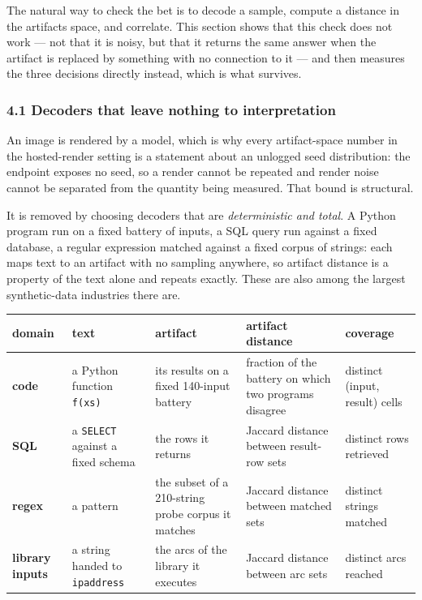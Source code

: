 \documentclass[
  10pt,
]{article}
\theoremstyle{plain}
\theoremstyle{definition}
\begin{document}
The natural way to check the bet is to decode a sample, compute a
distance in the artifact\textquotesingle s space, and correlate. This
section shows that this check does not work --- not that it is noisy,
but that it returns the same answer when the artifact is replaced by
something with no connection to it --- and then measures the three
decisions directly instead, which is what survives.

\subsubsection{4.1 Decoders that leave nothing to
interpretation}\label{41-decoders-that-leave-nothing-to-interpretation}

An image is rendered by a model, which is why every artifact-space
number in the hosted-render setting is a statement about an unlogged
seed distribution: the endpoint exposes no seed, so a render cannot be
repeated and render noise cannot be separated from the quantity being
measured. That bound is structural.

It is removed by choosing decoders that are \emph{deterministic and
total}. A Python program run on a fixed battery of inputs, a SQL query
run against a fixed database, a regular expression matched against a
fixed corpus of strings: each maps text to an artifact with no sampling
anywhere, so artifact distance is a property of the text alone and
repeats exactly. These are also among the largest synthetic-data
industries there are.

{\footnotesize
\begin{longtable}[]{@{}>{\raggedright\arraybackslash}p{}>{\raggedright\arraybackslash}p{}>{\raggedright\arraybackslash}p{}>{\raggedright\arraybackslash}p{}>{\raggedright\arraybackslash}p{}@{}}
\toprule\noalign{}
domain & text & artifact & artifact distance & coverage \\
\midrule\noalign{}
\endhead
\bottomrule\noalign{}
\endlastfoot
\textbf{code} & a Python function \texttt{f(xs)} & its results on a
fixed 140-input battery & fraction of the battery on which two programs
disagree & distinct (input, result) cells \\
\textbf{SQL} & a \texttt{SELECT} against a fixed schema & the rows it
returns & Jaccard distance between result-row sets & distinct rows
retrieved \\
\textbf{regex} & a pattern & the subset of a 210-string probe corpus it
matches & Jaccard distance between matched sets & distinct strings
matched \\
\textbf{library inputs} & a string handed to \texttt{ipaddress} & the
arcs of the library it executes & Jaccard distance between arc sets &
distinct arcs reached \\
\end{longtable}}
\end{document}
